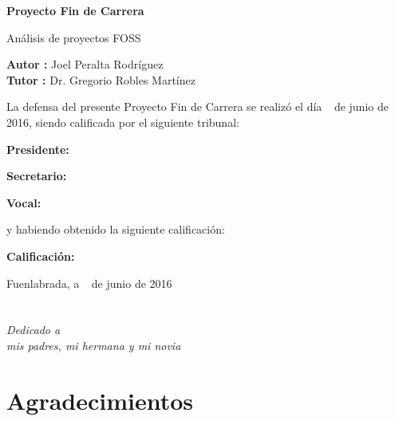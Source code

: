 \documentclass[a4paper, spanish, 12pt]{book}
\begin{document}
\vspace{-4cm}
\begin{center}
\LARGE
\textbf{Proyecto Fin de Carrera}

\vspace{1cm}
\large
An\'alisis de proyectos FOSS

\vspace{1cm}
\large
\textbf{Autor :} Joel Peralta Rodr\'iguez \\
\textbf{Tutor :} Dr. Gregorio Robles Mart\'inez

\end{center}

\vspace{1cm}
La defensa del presente Proyecto Fin de Carrera se realiz\'o el d\'ia \qquad$\;\,$ de junio de 2016, siendo calificada por el siguiente tribunal:


\vspace{0.5cm}
\textbf{Presidente:}

\vspace{1.2cm}
\textbf{Secretario:}

\vspace{1.2cm}
\textbf{Vocal:}


\vspace{1.2cm}
y habiendo obtenido la siguiente calificaci\'on:

\vspace{1cm}
\textbf{Calificaci\'on:}


\vspace{1cm}
\begin{flushright}
Fuenlabrada, a \qquad$\;\,$ de junio de 2016
\end{flushright}


\chapter*{}
\begin{flushright}
\textit{Dedicado a \\
mis padres, mi hermana y mi novia}
\end{flushright}


\chapter*{Agradecimientos}
\end{document}
